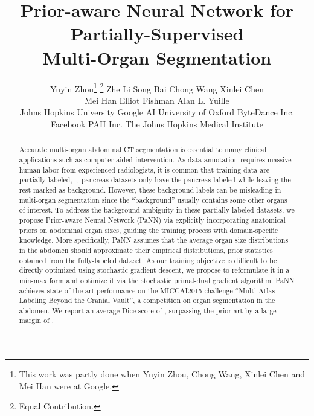 \documentclass[10pt,twocolumn,letterpaper]{article}
\begin{document}
\title{Prior-aware Neural Network for Partially-Supervised \\ Multi-Organ Segmentation}

\author{Yuyin Zhou\thanks{This work was partly done when Yuyin Zhou, Chong Wang, Xinlei Chen and Mei Han were at Google.} \thanks{Equal Contribution.} \qquad
Zhe Li \qquad
Song Bai \qquad
Chong Wang \qquad
Xinlei Chen \\
Mei Han \qquad
Elliot Fishman \qquad
Alan L. Yuille \vspace{.5em}\\
Johns Hopkins University \quad
Google AI \quad
University of Oxford \quad 
ByteDance Inc. \\
Facebook \quad
PAII Inc. \quad
The Johns Hopkins Medical Institute
\vspace{-1em}
}
\maketitle



\thispagestyle{empty}
\begin{abstract}
Accurate multi-organ abdominal CT segmentation is essential to many clinical applications such as computer-aided intervention. 
As data annotation requires massive human labor from experienced radiologists, it is common that training data are partially labeled,~\eg,~pancreas datasets only have the pancreas labeled while leaving the rest marked as background. However, these background labels can be misleading in multi-organ segmentation since the ``background'' usually contains some other organs of interest. 
To address the background ambiguity in these partially-labeled datasets, we propose Prior-aware Neural Network (PaNN) via explicitly incorporating anatomical priors on abdominal organ sizes, guiding the training process with domain-specific knowledge.
More specifically, PaNN assumes that the average organ size distributions in the abdomen should approximate their empirical distributions, prior statistics obtained from the fully-labeled dataset. 
As our training objective is difficult to be directly optimized using stochastic gradient descent,
we propose to reformulate it in a min-max form and optimize it via the stochastic primal-dual gradient algorithm. PaNN achieves state-of-the-art performance on the MICCAI2015 challenge ``Multi-Atlas Labeling Beyond the Cranial Vault'', a competition on organ segmentation in the abdomen. We report an average Dice score of , surpassing the prior art by a large margin of .
\end{abstract}
\end{document}
